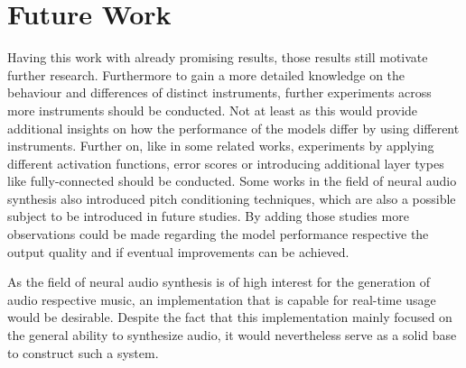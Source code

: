 \section{Future Work}
Having this work with already promising results, those results still motivate further research. Furthermore to gain a more detailed knowledge on the behaviour and differences of distinct instruments, further experiments across more instruments should be conducted. Not at least as this would provide additional insights on how the performance of the models differ by using different instruments. Further on, like in some related works, experiments by applying different activation functions, error scores or introducing additional layer types like fully-connected should be conducted. Some works in the field of neural audio synthesis also introduced pitch conditioning techniques, which are also a possible subject to be introduced in future studies. By adding those studies more observations could be made regarding the model performance respective the output quality and if eventual improvements can be achieved.

As the field of neural audio synthesis is of high interest for the generation of audio respective music, an implementation that is capable for real-time usage would be desirable. Despite the fact that this implementation mainly focused on the general ability to synthesize audio, it would nevertheless serve as a solid base to construct such a system.
